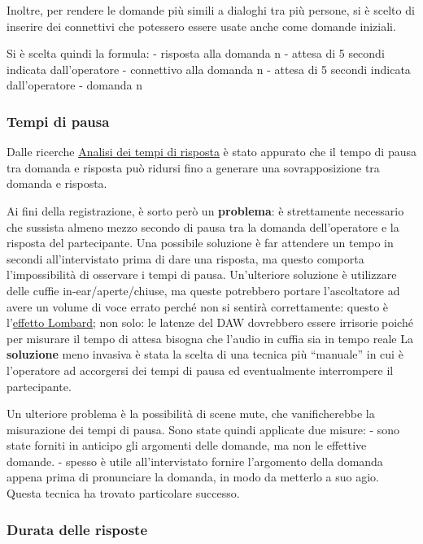 \documentclass[
]{article}
\begin{document}
Inoltre, per rendere le domande più simili a dialoghi tra più persone, si è scelto di inserire dei connettivi che potessero essere usate anche come domande iniziali.

Si è scelta quindi la formula: - risposta alla domanda n - attesa di 5 secondi indicata dall'operatore - connettivo alla domanda n - attesa di 5 secondi indicata dall'operatore - domanda n

\subsubsection{Tempi di pausa}\label{tempi-di-pausa}

Dalle ricerche \hyperref[analisi-dei-tempi-di-risposta]{Analisi dei tempi di risposta} è stato appurato che il tempo di pausa tra domanda e risposta può ridursi fino a generare una sovrapposizione tra domanda e risposta.

Ai fini della registrazione, è sorto però un \textbf{problema}: è strettamente necessario che sussista almeno mezzo secondo di pausa tra la domanda dell'operatore e la risposta del partecipante. Una possibile soluzione è far attendere un tempo in secondi all'intervistato prima di dare una risposta, ma questo comporta l'impossibilità di osservare i tempi di pausa. Un'ulteriore soluzione è utilizzare delle cuffie in-ear/aperte/chiuse, ma queste potrebbero portare l'ascoltatore ad avere un volume di voce errato perché non si sentirà correttamente: questo è l'\hyperref[Effetto-Lombard-e-la-cuffia-nel-doppiaggio-per-una-voce-naturale]{effetto Lombard}; non solo: le latenze del DAW dovrebbero essere irrisorie poiché per misurare il tempo di attesa bisogna che l'audio in cuffia sia in tempo reale La \textbf{soluzione} meno invasiva è stata la scelta di una tecnica più ``manuale'' in cui è l'operatore ad accorgersi dei tempi di pausa ed eventualmente interrompere il partecipante.

Un ulteriore problema è la possibilità di scene mute, che vanificherebbe la misurazione dei tempi di pausa. Sono state quindi applicate due misure: - sono state forniti in anticipo gli argomenti delle domande, ma non le effettive domande. - spesso è utile all'intervistato fornire l'argomento della domanda appena prima di pronunciare la domanda, in modo da metterlo a suo agio. Questa tecnica ha trovato particolare successo.

\subsubsection{Durata delle risposte}\label{durata-delle-risposte}
\end{document}
